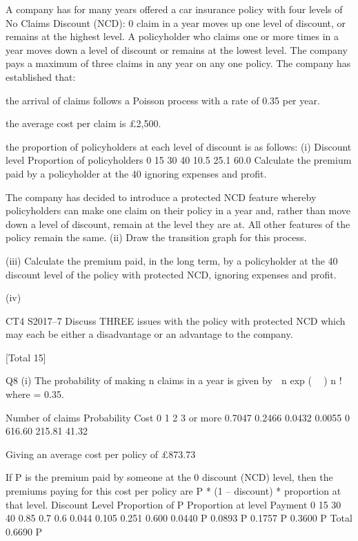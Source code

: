 \documentclass[a4paper,12pt]{article}
\begin{document}
A company has for many years offered a car insurance policy with four levels of No
Claims Discount (NCD): 0%
claim in a year moves up one level of discount, or remains at the highest level. A
policyholder who claims one or more times in a year moves down a level of discount
or remains at the lowest level. The company pays a maximum of three claims in any
year on any one policy.
The company has established that:
\item  the arrival of claims follows a Poisson process with a rate of 0.35 per year.
\item  the average cost per claim is £2,500.
\item  the proportion of policyholders at each level of discount is as follows:
(i)
Discount level Proportion of policyholders
0%
15%
30%
40%
10.5%
25.1%
60.0%
Calculate the premium paid by a policyholder at the 40%
ignoring expenses and profit.

The company has decided to introduce a protected NCD feature whereby
policyholders can make one claim on their policy in a year and, rather than move
down a level of discount, remain at the level they are at. All other features of the
policy remain the same.
(ii)
Draw the transition graph for this process.

(iii)
Calculate the premium paid, in the long term, by a policyholder at the 40%
discount level of the policy with protected NCD, ignoring expenses and profit.

(iv)

CT4 S2017–7 
Discuss THREE issues with the policy with protected NCD which may each
be either a disadvantage or an advantage to the company.

[Total 15]

Q8
(i)
The probability of making n claims in a year is given by
 n exp (  )
n !
where \lambda = 0.35.


Number of claims Probability Cost
0
1
2
3 or more 0.7047
0.2466
0.0432
0.0055 0
616.60
215.81
41.32

Giving an average cost per policy of £873.73

If P is the premium paid by someone at the 0%
discount (NCD) level, then the premiums paying for this cost per policy
are P * (1 – discount) * proportion at that level.
Discount Level Proportion of P Proportion at
level Payment
0
15%
30%
40%
0.85
0.7
0.6 0.044
0.105
0.251
0.600 0.0440 P
0.0893 P
0.1757 P
0.3600 P
Total 0.6690 P
\end{document}
